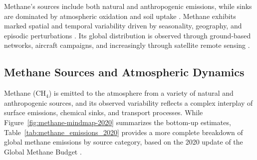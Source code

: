 Methane's sources include both natural and anthropogenic emissions, while sinks are dominated by atmospheric oxidation and soil uptake \cite{Saunois2020, global_methane_budget}. Methane exhibits marked spatial and temporal variability driven by seasonality, geography, and episodic perturbations \cite{Pandey2017, feng_tropical_2022}. Its global distribution is observed through ground-based networks, aircraft campaigns, and increasingly through satellite remote sensing \cite{Jacob2022, Lorente2021, Schneising2019}.

\subsection{Methane Sources and Atmospheric Dynamics}
\label{sec:ch4-sources-dynamics}

Methane (CH$_4$) is emitted to the atmosphere from a variety of natural and anthropogenic sources, and its observed variability reflects a complex interplay of surface emissions, chemical sinks, and transport processes. While Figure~\ref{fig:methane-mindmap-2020} summarizes the bottom-up estimates, Table~\ref{tab:methane_emissions_2020} provides a more complete breakdown of global methane emissions by source category, based on the 2020 update of the Global Methane Budget \cite{global_methane_budget}.

